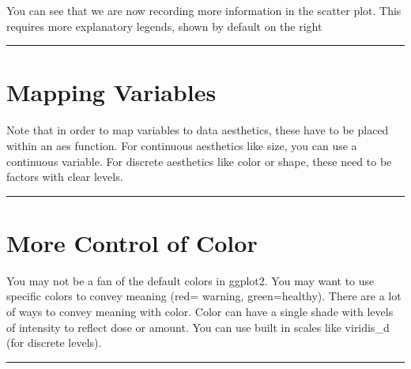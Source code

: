 \documentclass[
]{book}
\newenvironment{Shaded}{\begin{snugshade}}{\end{snugshade}}
\newcommand{\DataTypeTok}[1]{\textcolor[rgb]{0.13,0.29,0.53}{#1}}
\newcommand{\KeywordTok}[1]{\textcolor[rgb]{0.13,0.29,0.53}{\textbf{#1}}}
\newcommand{\NormalTok}[1]{#1}
\newcommand{\OperatorTok}[1]{\textcolor[rgb]{0.81,0.36,0.00}{\textbf{#1}}}
\newcommand{\StringTok}[1]{\textcolor[rgb]{0.31,0.60,0.02}{#1}}
\begin{document}
You can see that we are now recording more information in the scatter plot. This requires more explanatory legends, shown by default on the right

\begin{center}\rule{0.5\linewidth}{0.5pt}\end{center}

\hypertarget{mapping-variables}{%
\chapter{Mapping Variables}\label{mapping-variables}}

Note that in order to map variables to data aesthetics, these have to be placed within an aes function. For continuous aesthetics like size, you can use a continuous variable. For discrete aesthetics like color or shape, these need to be factors with clear levels.

\begin{center}\rule{0.5\linewidth}{0.5pt}\end{center}

\hypertarget{more-control-of-color}{%
\chapter{More Control of Color}\label{more-control-of-color}}

You may not be a fan of the default colors in ggplot2. You may want to use specific colors to convey meaning (red= warning, green=healthy). There are a lot of ways to convey meaning with color. Color can have a single shade with levels of intensity to reflect dose or amount. You can use built in scales like viridis\_d (for discrete levels).

\begin{center}\rule{0.5\linewidth}{0.5pt}\end{center}

\begin{Shaded}
\end{Shaded}
\end{document}
